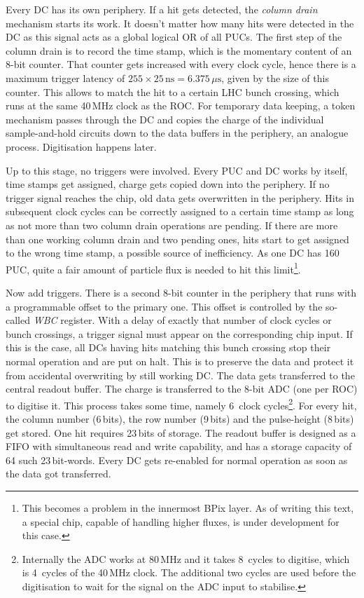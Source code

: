 Every \gls{DC} has its own periphery. If a hit gets detected, the \emph{column drain} mechanism starts its work. It doesn't matter how many hits were detected in the \gls{DC} as this signal acts as a global logical OR of all \glspl{PUC}. The first step of the column drain is to record the time stamp, which is the momentary content of an 8-bit counter. That counter gets increased with every clock cycle, hence there is a maximum trigger latency of $255\times25\,\text{ns}=6.375\,\mu\text{s}$, given by the size of this counter. This allows to match the hit to a certain LHC bunch crossing, which runs at the same 40\,MHz clock as the \gls{ROC}. For temporary data keeping, a token mechanism passes through the \gls{DC} and copies the charge of the individual sample-and-hold circuits down to the data buffers in the periphery, an analogue process. Digitisation happens later.

Up to this stage, no triggers were involved. Every \gls{PUC} and \gls{DC} works by itself, time stamps get assigned, charge gets copied down into the periphery. If no trigger signal reaches the chip, old data gets overwritten in the periphery. Hits in subsequent clock cycles can be correctly assigned to a certain time stamp as long as not more than two column drain operations are pending. If there are more than one working column drain and two pending ones, hits start to get assigned to the wrong time stamp, a possible source of inefficiency. As one \gls{DC} has 160\,\gls{PUC}, quite a fair amount of particle flux is needed to hit this limit\footnote{This becomes a problem in the innermost BPix layer. As of writing this text, a special chip, capable of handling higher fluxes, is under development for this case.}.

Now add triggers. There is a second 8-bit counter in the periphery that runs with a programmable offset to the primary one. This offset is controlled by the so-called \emph{WBC} register. With a delay of exactly that number of clock cycles or bunch crossings, a trigger signal must appear on the corresponding chip input. If this is the case, all \glspl{DC} having hits matching this bunch crossing stop their normal operation and are put on halt. This is to preserve the data and protect it from accidental overwriting by still working \gls{DC}. The data gets transferred to the central readout buffer.  The charge is transferred to the 8-bit ADC (one per \gls{ROC}) to digitise it. This process takes some time, namely 6~clock cycles\footnote{Internally the ADC works at 80\,MHz and it takes 8~cycles to digitise, which is 4~cycles of the 40\,MHz clock. The additional two cycles are used before the digitisation to wait for the signal on the ADC input to stabilise.}. For every hit, the column number (6\,bits), the row number (9\,bits) and the pulse-height (8\,bits) get stored. One hit requires 23\,bits of storage. The readout buffer is designed as a FIFO with simultaneous read and write capability, and has a storage capacity of 64 such 23\,bit-words. Every \gls{DC} gets re-enabled for normal operation as soon as the data got transferred.

